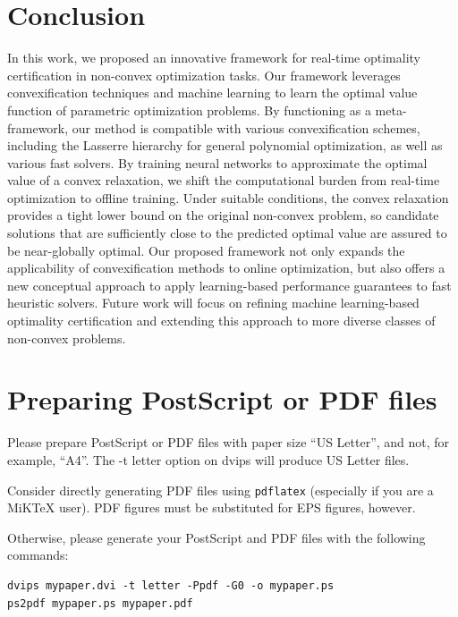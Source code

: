 \documentclass[10pt]{article} %
\theoremstyle{plain}
\theoremstyle{definition}
\theoremstyle{remark}
\begin{document}
\section{Conclusion} \label{sec:conclusion}
In this work, we proposed an innovative framework for real-time optimality certification in non-convex optimization tasks.
Our framework leverages convexification techniques and machine learning to learn the optimal value function of parametric optimization problems.
{By functioning as a meta-framework, our method is compatible with various convexification schemes, including the Lasserre hierarchy for general polynomial optimization, as well as various fast solvers.} By training neural networks to approximate the optimal value of a convex relaxation, we shift the computational burden from real-time optimization to offline training. Under suitable conditions, the convex relaxation provides a tight lower bound on the original non-convex problem, so candidate solutions that are sufficiently close to the predicted optimal value are assured to be near-globally optimal.
Our proposed framework not only expands the applicability of convexification methods to online optimization, but also offers a new conceptual approach to apply learning-based performance guarantees to fast heuristic solvers.
Future work will focus on refining machine learning-based optimality certification and extending this approach to more diverse classes of non-convex problems.






\section{Preparing PostScript or PDF files}

Please prepare PostScript or PDF files with paper size ``US Letter'', and
not, for example, ``A4''. The -t
letter option on dvips will produce US Letter files.

Consider directly generating PDF files using \verb+pdflatex+
(especially if you are a MiKTeX user).
PDF figures must be substituted for EPS figures, however.

Otherwise, please generate your PostScript and PDF files with the following commands:
\begin{verbatim}
dvips mypaper.dvi -t letter -Ppdf -G0 -o mypaper.ps
ps2pdf mypaper.ps mypaper.pdf
\end{verbatim}
\end{document}
